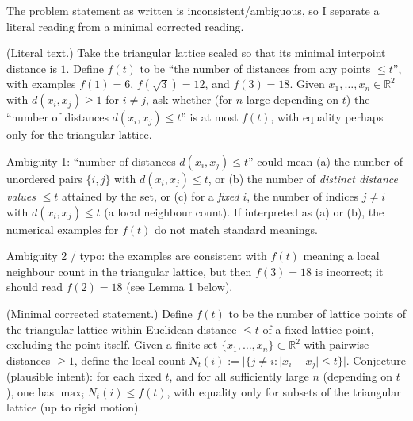 The problem statement as written is inconsistent/ambiguous, so I separate a literal reading from a minimal corrected reading.

(Literal text.)
Take the triangular lattice scaled so that its minimal interpoint distance is $1$. Define $f(t)$ to be
``the number of distances from any points $\le t$'', with examples $f(1)=6$, $f(\sqrt3)=12$, and $f(3)=18$.
Given $x_1,\ldots,x_n\in\mathbb{R}^2$ with $d(x_i,x_j)\ge 1$ for $i\neq j$, ask whether (for $n$ large depending on $t$) the
``number of distances $d(x_i,x_j)\le t$'' is at most $f(t)$, with equality perhaps only for the triangular lattice.

Ambiguity 1: ``number of distances $d(x_i,x_j)\le t$'' could mean
(a) the number of unordered pairs $\{i,j\}$ with $d(x_i,x_j)\le t$, or
(b) the number of \emph{distinct distance values} $\le t$ attained by the set, or
(c) for a \emph{fixed} $i$, the number of indices $j\neq i$ with $d(x_i,x_j)\le t$ (a local neighbour count).
If interpreted as (a) or (b), the numerical examples for $f(t)$ do not match standard meanings.

Ambiguity 2 / typo: the examples are consistent with $f(t)$ meaning a local neighbour count in the triangular lattice,
but then $f(3)=18$ is incorrect; it should read $f(2)=18$ (see Lemma 1 below).

(Minimal corrected statement.)
Define $f(t)$ to be the number of lattice points of the triangular lattice within Euclidean distance $\le t$ of a fixed lattice point, excluding the point itself.
Given a finite set $\{x_1,\ldots,x_n\}\subset\mathbb{R}^2$ with pairwise distances $\ge 1$, define the local count
$N_t(i):=|\{j\neq i: |x_i-x_j|\le t\}|$.
Conjecture (plausible intent): for each fixed $t$, and for all sufficiently large $n$ (depending on $t$), one has
$\max_i N_t(i)\le f(t)$, with equality only for subsets of the triangular lattice (up to rigid motion).
